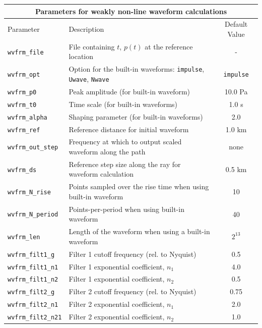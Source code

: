 \documentclass[10pt]{article}
\begin{document}
 \begin{tabular}{ | l | l | c | }
  \hline
  \multicolumn{3}{|c|}{\textbf{Parameters for weakly non-line waveform calculations}} \\
  \hline
  Parameter & Description & Default Value \\
  \hline \hline
	\verb=wvfrm_file=		& File containing \(t\), \(p \left( t \right)\) at the reference location	& - \\
	\verb=wvfrm_opt=		& Option for the built-in waveforms: \verb#impulse#, \verb#Uwave#, \verb#Nwave#		& \verb#impulse# \\
	\verb=wvfrm_p0=		& Peak amplitude (for built-in waveform)						& 10.0 Pa \\
	\verb=wvfrm_t0=		& Time scale (for built-in waveforms)							& 1.0 s \\
	\verb=wvfrm_alpha=		& Shaping parameter (for built-in waveforms)					& 2.0 \\
	\verb=wvfrm_ref=		& Reference distance for initial waveform						& 1.0 km \\
	\verb=wvfrm_out_step=	& Frequency at which to output scaled waveform along the path	& none \\ \hline
	\verb=wvfrm_ds=		& Reference step size along the ray for waveform calculation 		& 0.5 km \\
	\verb=wvfrm_N_rise=	& Points sampled over the rise time when using built-in waveform	& 10 \\ 
	\verb=wvfrm_N_period=	& Points-per-period when using built-in waveform				& 40 \\ 
	\verb=wvfrm_len=		& Length of the waveform when using a built-in waveform			& \(2^{13}\) \\ 
	\verb=wvfrm_filt1_g=		& Filter 1 cutoff frequency (rel. to Nyquist)						& 0.5 \\
	\verb=wvfrm_filt1_n1=	& Filter 1 exponential coefficient, \(n_1\)						& 4.0 \\
	\verb=wvfrm_filt1_n2=	& Filter 1 exponential coefficient, \(n_2\)						& 0.5 \\
	\verb=wvfrm_filt2_g=		& Filter 2 cutoff frequency (rel. to Nyquist)						& 0.75 \\
	\verb=wvfrm_filt2_n1=	& Filter 2 exponential coefficient, \(n_1\)						& 2.0 \\
	\verb=wvfrm_filt2_n21=	& Filter 2 exponential coefficient, \(n_2\)						& 1.0 \\ \hline
\end{tabular}
 
\vspace*{25 pt}
 
\end{document}
